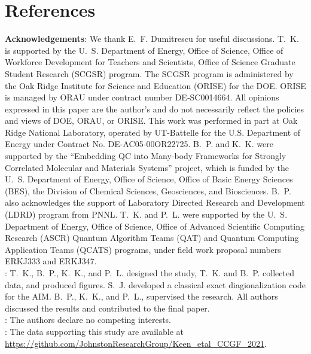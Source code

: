 \documentclass[aip,reprint,table,xcdraw,usenames,dvipsnames]{revtex4-1}
\begin{document}
\section*{References}

\vspace{0.5cm}
\noindent
{\bf Acknowledgements}: We thank E.~F. Dumitrescu for useful discussions. T.~K. is supported by the U.~S. Department of Energy, Office of Science, Office of Workforce Development for Teachers and Scientists, Office of Science Graduate Student Research (SCGSR) program. The SCGSR program is administered by the Oak Ridge Institute for Science and Education (ORISE) for the DOE. ORISE is managed by ORAU under contract number DE‐SC0014664. All opinions expressed in this paper are the author’s and do not necessarily reflect the policies and views of DOE, ORAU, or ORISE. This work was performed in part at Oak Ridge National Laboratory, operated by UT-Battelle for the U.S. Department of Energy under Contract No. DE-AC05-00OR22725. B.~P. and K.~K. were supported by  the ``Embedding QC into Many-body Frameworks for Strongly Correlated  Molecular and Materials Systems'' project, which is funded by the U.~S. Department of Energy, Office of Science, Office of Basic Energy Sciences (BES), the Division of Chemical Sciences, Geosciences, and Biosciences. B.~P. also acknowledges the support of Laboratory Directed Research and Development (LDRD) program from PNNL. T.~K. and P.~L. were supported by the U.~S. Department of Energy, Office of Science, Office of Advanced Scientific Computing Research (ASCR) Quantum Algorithm Teams (QAT) and Quantum Computing Application Teams (QCATS) programs, under field work proposal numbers ERKJ333 and ERKJ347.\\

: T.~K., B.~P., K.~K., and P.~L. designed the study, T.~K. and B.~P. collected data, and produced figures. S.~J. developed a classical exact diagionalization code for the AIM. B.~P., K.~K., and P.~L., supervised the research. All authors discussed the results and contributed to the final paper. \\

: The authors declare no competing interests.\\

: The data supporting this study are available at \url{https://github.com/JohnstonResearchGroup/Keen_etal_CCGF_2021}.\\
\end{document}
